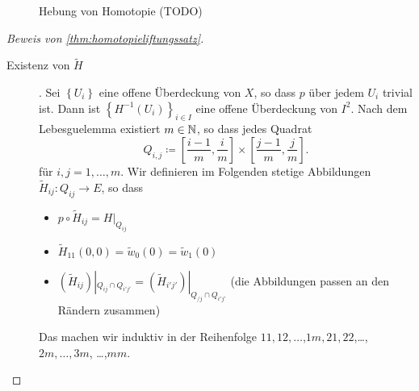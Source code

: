 \begin{figure}[ht]
    \centering
    \caption{Hebung von Homotopie (TODO)}
    \label{fig:hebung-von-homotopie}
\end{figure}


\begin{proof}[Beweis von \autoref{thm:homotopieliftungssatz}]
    \begin{description}
        \item[Existenz von $\tilde{H}$]. Sei $\left \{U_i\right\} $ eine offene Überdeckung von $X$, so dass  $p$ über jedem  $U_i$ trivial ist. Dann ist  $\left \{H^{-1}(U_i)\right\} _{i \in I}$ eine offene Überdeckung von $I^2$. Nach dem Lebesguelemma existiert $m\in \mathbb{N}$, so dass jedes Quadrat
            \[
            Q_{i,j} \coloneqq  \left[ \frac{i-1}{m}, \frac{i}{m} \right] \times \left[ \frac{j-1}{m}, \frac{j}{m} \right] 
            .\] 
            für $i,j = 1,\ldots,m$.
            Wir definieren im Folgenden stetige Abbildungen $\tilde{H}_{ij}\colon  Q_{ij} \to  E$, so dass
            \begin{itemize}
                \item $ p \circ  \tilde{H}_{ij} = H|_{Q_{ij}}$ 
                \item $\tilde{H}_{11}(0,0) = \tilde{w}_0(0) = \tilde{w}_1(0)$
                \item $(\tilde{H}_{ij})|_{Q_{ij} \cap  Q_{i'j'}} = (\tilde{H}_{i'j'})|_{Q_{/j} \cap  Q_{i'j'}}$ (die Abbildungen passen an den Rändern zusammen)
            \end{itemize}
    Das machen wir induktiv in der Reihenfolge $11,12,\ldots$,$1m, 21,22$,\ldots,$2m, \ldots, 3m$, \ldots,$mm$.


\end{description}
\end{proof}
